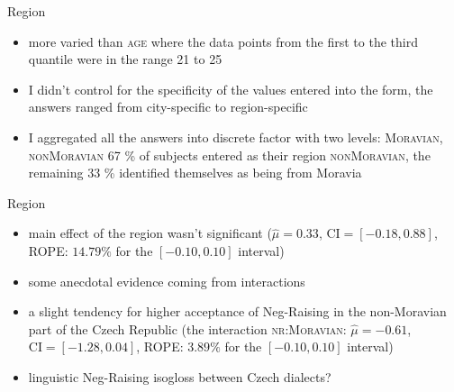 \documentclass[
  ignorenonframetext,
]{beamer}
\providecommand{\tightlist}{%
  \setlength{\itemsep}{0pt}\setlength{\parskip}{0pt}}\usepackage{longtable,booktabs,array}
\begin{document}
\begin{frame}
\begin{block}{Region}
\protect\hypertarget{region}{}
\begin{itemize}
\tightlist
\item
  more varied than \textsc{age} where the data points from the first to
  the third quantile were in the range 21 to 25
\item
  I didn't control for the specificity of the values entered into the
  form, the answers ranged from city-specific to region-specific
\item
  I aggregated all the answers into discrete factor with two levels:
  \textsc{Moravian, nonMoravian} 67 \% of subjects entered as their
  region \textsc{nonMoravian}, the remaining 33 \% identified themselves
  as being from Moravia
\end{itemize}
\end{block}
\end{frame}

\begin{frame}
\begin{block}{Region}
\protect\hypertarget{region-1}{}
\begin{itemize}
\tightlist
\item
  main effect of the region wasn't significant (\(\hat{\mu}=0.33\),
  \(\mathrm{CI}=[-0.18, 0.88]\), ROPE: \(14.79\%\) for the
  \([-0.10, 0.10]\) interval)
\item
  some anecdotal evidence coming from interactions
\item
  a slight tendency for higher acceptance of Neg-Raising in the
  non-Moravian part of the Czech Republic (the interaction
  \textsc{nr:Moravian}: \(\hat{\mu}=-0.61\),
  \(\mathrm{CI}=[-1.28, 0.04]\), ROPE: \(3.89\%\) for the
  \([-0.10, 0.10]\) interval)
\item
  linguistic Neg-Raising isogloss between Czech dialects?
\end{itemize}
\end{block}
\end{frame}
\end{document}
